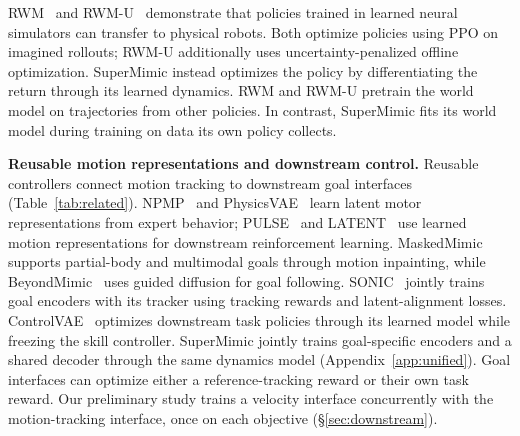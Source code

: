 RWM~\citep{li2025robotic} and RWM-U~\citep{li2025uncertainty} demonstrate that policies trained in learned neural simulators can transfer to physical robots.
Both optimize policies using PPO on imagined rollouts; RWM-U additionally uses uncertainty-penalized offline optimization.
SuperMimic instead optimizes the policy by differentiating the return through its learned dynamics.
RWM and RWM-U pretrain the world model on trajectories from other policies. In contrast, SuperMimic fits its world model during training on data its own policy collects.

\textbf{Reusable motion representations and downstream control.}
Reusable controllers connect motion tracking to downstream goal interfaces (Table~\ref{tab:related}).
NPMP~\citep{merel2018neural} and PhysicsVAE~\citep{won2022physics} learn latent motor representations from expert behavior; PULSE~\citep{luo2024universal} and LATENT~\citep{zhang2026learning} use learned motion representations for downstream reinforcement learning.
MaskedMimic~\citep{tessler2024maskedmimic} supports partial-body and multimodal goals through motion inpainting, while BeyondMimic~\citep{liao2025beyondmimic} uses guided diffusion for goal following.
SONIC~\citep{luo2025sonic} jointly trains goal encoders with its tracker using tracking rewards and latent-alignment losses.
ControlVAE~\citep{yao2022controlvae} optimizes downstream task policies through its learned model while freezing the skill controller.
SuperMimic jointly trains goal-specific encoders and a shared decoder through the same dynamics model (Appendix~\ref{app:unified}).
Goal interfaces can optimize either a reference-tracking reward or their own task reward.
Our preliminary study trains a velocity interface concurrently with the motion-tracking interface, once on each objective (\S\ref{sec:downstream}).
